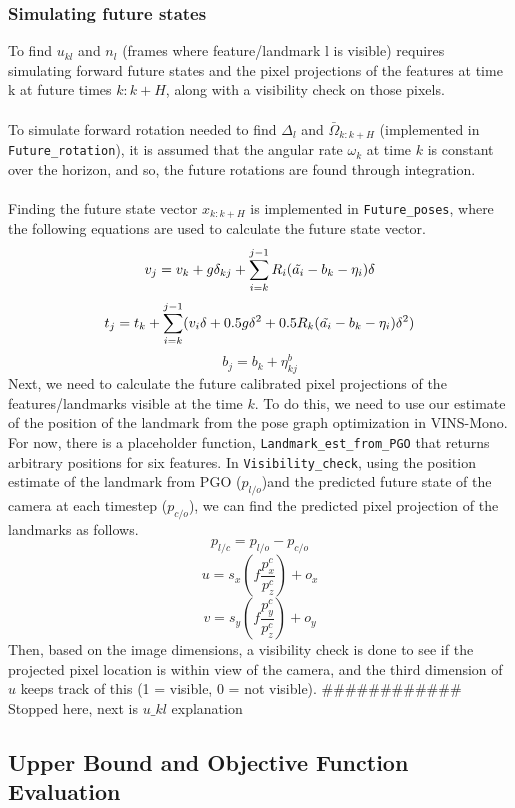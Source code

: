 \documentclass{article}
\begin{document}
\subsubsection{Simulating future states}
To find $u_{kl}$ and $n_l$ (frames where feature/landmark l is visible) requires simulating forward future states and the pixel projections of the features at time k at future times $k:k+H$, along with a visibility check on those pixels. \\ \\
To simulate forward rotation needed to find $\Delta_l$ and $ \bar{\Omega}_{k:k+H}$ (implemented in \texttt{Future\_rotation}), it is assumed that the angular rate $\omega_k$ at time $k$ is constant over the horizon, and so, the future rotations are found through integration.  \\ \\
Finding the future state vector $x_{k:k+H}$ is implemented in \texttt{Future\_poses}, where the following equations are used to calculate the future state vector. 
\begin{equation}
    v_j = v_k + g\delta_{kj} + \sum_{i=k}^{j-1} R_i(\Tilde{a_i} -b_k -\eta_i)\delta
\end{equation}
\begin{equation}
    t_j = t_k + \sum_{i=k}^{j-1} (v_i\delta+0.5g\delta^2+0.5R_k(\Tilde{a_i} -b_k -\eta_i)\delta^2)
\end{equation}
\begin{equation}
    b_j = b_k +\eta_{kj}^b
\end{equation}
Next, we need to calculate the future calibrated pixel projections of the features/landmarks visible at the time $k$. To do this, we need to use our estimate of the position of the landmark from the pose graph optimization in VINS-Mono. For now, there is a placeholder function, \texttt{Landmark\_est\_from\_PGO} that returns arbitrary positions for six features. In \texttt{Visibility\_check}, using the position estimate of the landmark from PGO ($p_{l/o}$)and the predicted future state of the camera at each timestep ($p_{c/o}$), we can find the predicted pixel projection of the landmarks as follows.
\begin{equation}
    p_{l/c} = p_{l/o} - p_{c/o}
\end{equation}
\begin{equation}
    u = s_x(f\frac{p_x^c}{p_z^c}) + o_x
\end{equation}
\begin{equation}
    v = s_y(f\frac{p_y^c}{p_z^c}) + o_y
\end{equation}
Then, based on the image dimensions, a visibility check is done to see if the projected pixel location is within view of the camera, and the third dimension of $u$ keeps track of this (1 = visible, 0 = not visible). 
############ Stopped here, next is $u\_{kl}$ explanation
\subsection{Upper Bound and Objective Function Evaluation}
\end{document}
